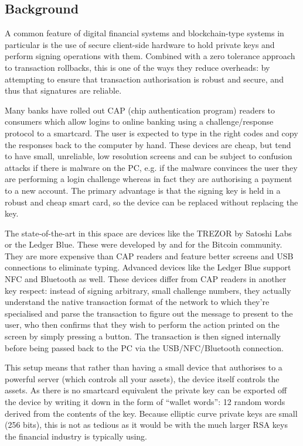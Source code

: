 \documentclass{article}
\begin{document}
\subsection{Background}

A common feature of digital financial systems and blockchain-type systems in particular is the use of secure client-side
hardware to hold private keys and perform signing operations with them. Combined with a zero tolerance approach to
transaction rollbacks, this is one of the ways they reduce overheads: by attempting to ensure that transaction
authorisation is robust and secure, and thus that signatures are reliable.

Many banks have rolled out CAP (chip authentication program) readers to consumers which allow logins to online banking using a
challenge/response protocol to a smartcard. The user is expected to type in the right codes and copy the responses back
to the computer by hand. These devices are cheap, but tend to have small, unreliable, low resolution screens and can be
subject to confusion attacks if there is malware on the PC, e.g. if the malware convinces the user they are performing
a login challenge whereas in fact they are authorising a payment to a new account. The primary advantage is that the
signing key is held in a robust and cheap smart card, so the device can be replaced without replacing the key.

The state-of-the-art in this space are devices like the TREZOR\cite{TREZOR} by Satoshi Labs or the Ledger Blue. These
were developed by and for the Bitcoin community. They are more expensive than CAP readers and feature better
screens and USB connections to eliminate typing. Advanced devices like the Ledger Blue support NFC and
Bluetooth as well. These devices differ from CAP readers in another key respect: instead of signing arbitrary, small
challenge numbers, they actually understand the native transaction format of the network to which they're specialised and parse the
transaction to figure out the message to present to the user, who then confirms that they wish to perform the action
printed on the screen by simply pressing a button. The transaction is then signed internally before being passed back to
the PC via the USB/NFC/Bluetooth connection.

This setup means that rather than having a small device that authorises to a powerful server (which controls all your
assets), the device itself controls the assets. As there is no smartcard equivalent the private key can be exported off
the device by writing it down in the form of ``wallet words'': 12 random words derived from the contents of the key.
Because elliptic curve private keys are small (256 bits), this is not as tedious as it would be with the much larger RSA
keys the financial industry is typically using.
\end{document}
